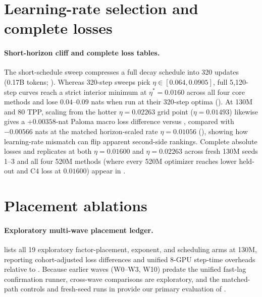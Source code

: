\FloatBarrier
\section{Learning-rate selection and complete losses}
\label{app:appendix_lr}

\paragraph{Short-horizon cliff and complete loss tables.}
The short-schedule sweep compresses a full decay schedule into 320 updates (0.17B tokens; ). Whereas 320-step sweeps pick $\eta\in[0.064,0.0905]$, full 5,120-step curves reach a strict interior minimum at $\eta^*=0.0160$ across all four core methods and lose $0.04\text{--}0.09$ nats when run at their 320-step optima (). At 130M and 80 TPP, scaling from the hotter $\eta=0.02263$ grid point ($\eta=0.01493$) likewise gives a $+0.00358$-nat Paloma macro loss difference versus , compared with $-0.00566$ nats at the matched horizon-scaled rate $\eta=0.01056$ (), showing how learning-rate mismatch can flip apparent second-side rankings. Complete absolute losses and replicates at both $\eta=0.01600$ and $\eta=0.02263$ across fresh 130M seeds 1--3 and all four 520M methods (where every 520M optimizer reaches lower held-out and C4 loss at $0.01600$) appear in .






\FloatBarrier
\section{Placement ablations}
\label{app:ablations}

\paragraph{Exploratory multi-wave placement ledger.}
 lists all 19 exploratory factor-placement, exponent, and scheduling arms at 130M, reporting cohort-adjusted loss differences and unified 8-GPU step-time overheads relative to . Because earlier waves (W0--W3, W10) predate the unified fast-lag confirmation runner, cross-wave comparisons are exploratory, and the matched-path controls and fresh-seed runs in  provide our primary evaluation of .

